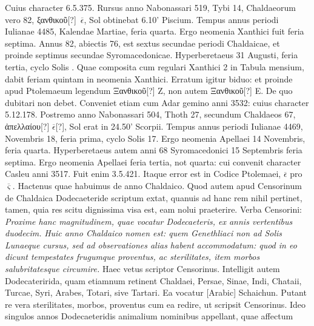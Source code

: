 Cuius character 6.5.375.
Rursus anno Nabonassari
519, Tybi 14, Chaldaeorum vero 82,
 \textgreek{ξανθικοῦ[?]}~$\overline\epsilon$, Sol obtinebat
6.10' Piscium.
Tempus annus periodi Iulianae %
 4485, Kalendae
Martiae, %
 feria quarta.
Ergo neomenia Xanthici fuit feria septima.
Annus
82, abiectis 76, est sextus secundae periodi Chaldaicae, et proinde
septimus secundae Syromacedonicae.
Hyperberetaeus 31 Augusti, feria
tertia, cyclo Solis .
Quae composita cum regulari Xanthici 2 in
Tabula mensium, dabit feriam quintam in neomenia Xanthici.
Erratum
igitur biduo: et proinde apud Ptolemaeum legendum \textgreek{Ξανθικοῦ[?]} Z,
non autem \textgreek{Ξανθικοῦ[?]} E.
De quo dubitari non debet.
Conveniet etiam
cum Adar gemino anni 3532: cuius character 5.12.178.
Postremo anno
Nabonassari 504, Thoth 27, secundum Chaldaeos 67, \textgreek{ἀπελλαίου[?]}
$\overline\epsilon$[?], Sol erat in 24.50' Scorpii.
Tempus annus periodi Iulianae 4469,
Novembris 18, feria prima, cyclo Solis 17.
Ergo neomenia Apellaei 14
Novembris, feria quarta.
Hyperberetaeus autem anni 68 Syromacedonici
15 Septembris feria septima.
Ergo neomenia Apellaei feria tertia,
not quarta: cui convenit character Casleu anni 3517.
Fuit enim 3.5.421.
Itaque error est in Codice Ptolemaei,
 $\overline\epsilon$ pro $\overline\varsigma$.
Hactenus quae habuimus
de anno Chaldaico.
Quod autem apud Censorinum de Chaldaica
Dodecaeteride scriptum extat, quanuis ad hanc rem nihil pertinet,
tamen, quia res scitu dignissima visa est, eam nolui praeterire.
Verba Censorini:
\emph{Proxime hanc magnitudinem, quae vocatur Dodecaeteris,
ex annis vertentibus duodecim.}
\emph{Huic anno Chaldaico nomen est: quem
Genethliaci non ad Solis Lunaeque cursus, sed ad observationes alias habent 
accommodatum: quod in eo dicunt tempestates frugumque proventus,
ac sterilitates, item morbos salubritatesque circumire.}
Haec %
 vetus scriptor
Censorinus.
Intelligit autem Dodecateririda, quam etiamnum retinent
Chaldaei, Persae, Sinae, %
 Indi, Chataii, Turcae, Syri, Arabes, Totari,
sive Tartari.
Ea vocatur \textarabic{[Arabic]} Schaichun.
Putant re vera sterilitates,
morbos, proventus cum ea redire, ut scripsit Censorinus. %
Ideo singulos
annos Dodecaeteridis animalium nominibus appellant, quae affectum
